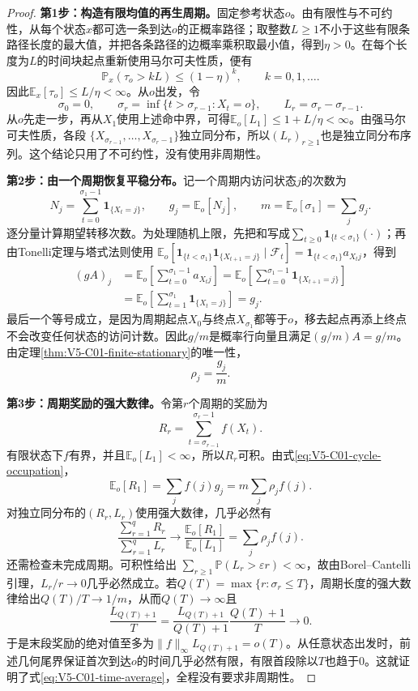 \begin{proof}
\textbf{第1步：构造有限均值的再生周期。}固定参考状态$o$。由有限性与不可约性，从每个状态$x$都可选一条到达$o$的正概率路径；取整数$L\ge1$不小于这些有限条路径长度的最大值，并把各条路径的边概率乘积取最小值，得到$\eta>0$。在每个长度为$L$的时间块起点重新使用马尔可夫性质，便有
\[
\mathbb P_x(\tau_o>kL)\le(1-\eta)^k,
\qquad k=0,1,\ldots.
\]
因此$\mathbb E_x[\tau_o]\le L/\eta<\infty$。从$o$出发，令
\[
\sigma_0=0,
\qquad
\sigma_r=\inf\{t>\sigma_{r-1}:X_t=o\},
\qquad
L_r=\sigma_r-\sigma_{r-1}.
\]
从$o$先走一步，再从$X_1$使用上述命中界，可得$\mathbb E_o[L_1]\le1+L/\eta<\infty$。由强马尔可夫性质，各段
$\{X_{\sigma_{r-1}},\ldots,X_{\sigma_r-1}\}$独立同分布，所以$(L_r)_{r\ge1}$也是独立同分布序列。这个结论只用了不可约性，没有使用非周期性。

\textbf{第2步：由一个周期恢复平稳分布。}记一个周期内访问状态$j$的次数为
\[
N_j=\sum_{t=0}^{\sigma_1-1}\mathbf 1_{\{X_t=j\}},
\qquad
g_j=\mathbb E_o[N_j],
\qquad
m=\mathbb E_o[\sigma_1]=\sum_jg_j.
\]
逐分量计算期望转移次数。为处理随机上限，先把和写成$\sum_{t\ge0}\mathbf 1_{\{t<\sigma_1\}}(\cdot)$；再由Tonelli定理与塔式法则使用
$\mathbb E_o[\mathbf 1_{\{t<\sigma_1\}}\mathbf 1_{\{X_{t+1}=j\}}\mid\mathcal F_t]
=\mathbf 1_{\{t<\sigma_1\}}a_{X_tj}$，得到
\[
\begin{aligned}
(gA)_j
&=\mathbb E_o\!\left[\sum_{t=0}^{\sigma_1-1}a_{X_tj}\right]
=\mathbb E_o\!\left[\sum_{t=0}^{\sigma_1-1}\mathbf 1_{\{X_{t+1}=j\}}\right]\\
&=\mathbb E_o\!\left[\sum_{t=1}^{\sigma_1}\mathbf 1_{\{X_t=j\}}\right]
=g_j.
\end{aligned}
\]
最后一个等号成立，是因为周期起点$X_0$与终点$X_{\sigma_1}$都等于$o$，移去起点再添上终点不会改变任何状态的访问计数。因此$g/m$是概率行向量且满足$(g/m)A=g/m$。由定理\ref{thm:V5-C01-finite-stationary}的唯一性，
\begin{equation}\label{eq:V5-C01-cycle-occupation}
\rho_j=\frac{g_j}{m}.
\end{equation}

\textbf{第3步：周期奖励的强大数律。}令第$r$个周期的奖励为
\[
R_r=\sum_{t=\sigma_{r-1}}^{\sigma_r-1}f(X_t).
\]
有限状态下$f$有界，并且$\mathbb E_o[L_1]<\infty$，所以$R_r$可积。由式\eqref{eq:V5-C01-cycle-occupation}，
\[
\mathbb E_o[R_1]=\sum_jf(j)g_j
=m\sum_j\rho_jf(j).
\]
对独立同分布的$(R_r,L_r)$使用强大数律，几乎必然有
\[
\frac{\sum_{r=1}^qR_r}{\sum_{r=1}^qL_r}
\longrightarrow
\frac{\mathbb E_o[R_1]}{\mathbb E_o[L_1]}
=\sum_j\rho_jf(j).
\]
还需检查未完成周期。可积性给出
$\sum_{r\ge1}\mathbb P(L_r>\varepsilon r)<\infty$，故由Borel--Cantelli引理，$L_r/r\to0$几乎必然成立。若$Q(T)=\max\{r:\sigma_r\le T\}$，周期长度的强大数律给出$Q(T)/T\to1/m$，从而$Q(T)\to\infty$且
\[
\frac{L_{Q(T)+1}}{T}
=\frac{L_{Q(T)+1}}{Q(T)+1}\frac{Q(T)+1}{T}
\longrightarrow0.
\]
于是末段奖励的绝对值至多为$\lVert f\rVert_\infty L_{Q(T)+1}=o(T)$。从任意状态出发时，前述几何尾界保证首次到达$o$的时间几乎必然有限，有限首段除以$T$也趋于$0$。这就证明了式\eqref{eq:V5-C01-time-average}，全程没有要求非周期性。


\end{proof}
